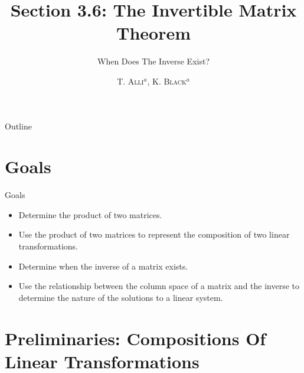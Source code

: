 \documentclass[svgnames,table,,aspectratio=169]{beamer}
\begin{document}
\author{\textsc{T. Alli$^{a}$, K. Black$^{a}$}}
\subject{Linear Algebra}


\title{Section 3.6: The Invertible Matrix Theorem}
\subtitle{When Does The Inverse Exist?}


\date{} %

\begin{frame}
  \titlepage
\end{frame}

\begin{frame}{Outline}
  \tableofcontents
\end{frame}


\section{Goals}

\begin{frame}{Goals}

  \begin{itemize}
  \item Determine the product of two matrices.
  \item Use the product of two matrices to represent the composition
    of two linear transformations.
  \item Determine when the inverse of a matrix exists.
  \item Use the relationship between the column space of a matrix and
    the inverse to determine the nature of the solutions to a linear
    system.
  \end{itemize}

\end{frame}

\section{Preliminaries: Compositions Of Linear Transformations}
\end{document}
